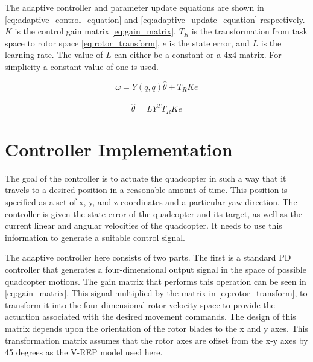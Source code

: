 \documentclass[letterpaper,12pt,titlepage,oneside,final]{book}
\begin{document}
The adaptive controller and parameter update equations are shown in \eqref{eq:adaptive_control_equation} and \eqref{eq:adaptive_update_equation} respectively.
$K$ is the control gain matrix \eqref{eq:gain_matrix}, $T_{R}$ is the transformation from task space to rotor space \eqref{eq:rotor_transform}, $e$ is the state error, and $L$ is the learning rate.
The value of $L$ can either be a constant or a 4x4 matrix.
For simplicity a constant value of one is used.

\begin{equation} \label{eq:adaptive_control_equation}
\omega = Y(q,\dot{q})\hat{\theta} + T_{R}Ke
\end{equation}

\begin{equation} \label{eq:adaptive_update_equation}
\dot{\hat{\theta}} = LY^{T}T_{R}Ke
\end{equation}


\section{Controller Implementation}


The goal of the controller is to actuate the quadcopter in such a way that it travels to a desired position in a reasonable amount of time. 
This position is specified as a set of x, y, and z coordinates and a particular yaw direction. 
The controller is given the state error of the quadcopter and its target, as well as the current linear and angular velocities of the quadcopter. 
It needs to use this information to generate a suitable control signal.

The adaptive controller here consists of two parts. The first is a standard PD controller that generates a four-dimensional output signal in the space of possible quadcopter motions. 
The gain matrix that performs this operation can be seen in \eqref{eq:gain_matrix}. 
This signal multiplied by the matrix in \eqref{eq:rotor_transform}, to transform it into the four dimensional rotor velocity space to provide the actuation associated with the desired movement commands.
The design of this matrix depends upon the orientation of the rotor blades to the x and y axes. 
This transformation matrix assumes that the rotor axes are offset from the x-y axes by 45 degrees as the V-REP model used here.
\end{document}

